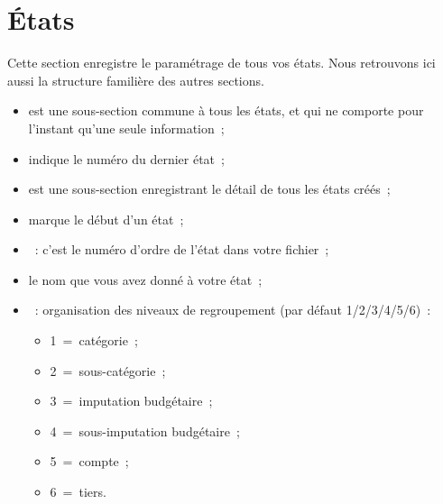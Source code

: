 \section{États\label{xml-reports} }

Cette section enregistre le paramétrage de tous vos états.
Nous retrouvons ici aussi la structure familière des autres sections. 

\begin{itemize}

\item  {} est une sous-section commune à tous les états, et qui ne comporte pour l'instant qu'une seule information~;

\item  {} indique le numéro du dernier état~;

\item  {} est une sous-section enregistrant le détail de tous les états créés~;

      \item  {} marque le début d'un état~;

        \item  {}~: c'est le numéro d'ordre de l'état dans votre fichier~;

        \item  {} le nom que vous avez donné à votre état~;

        \item  {}~: organisation des niveaux de regroupement (par défaut 1/2/3/4/5/6)~:

		\begin{itemize}

		\item  1~=~catégorie~;

		\item  2~=~sous-catégorie~;

		\item  3~=~imputation budgétaire~;

		\item  4~=~sous-imputation budgétaire~;

		\item  5~=~compte~;

		\item  6~=~tiers.


\end{itemize}
\end{itemize}
